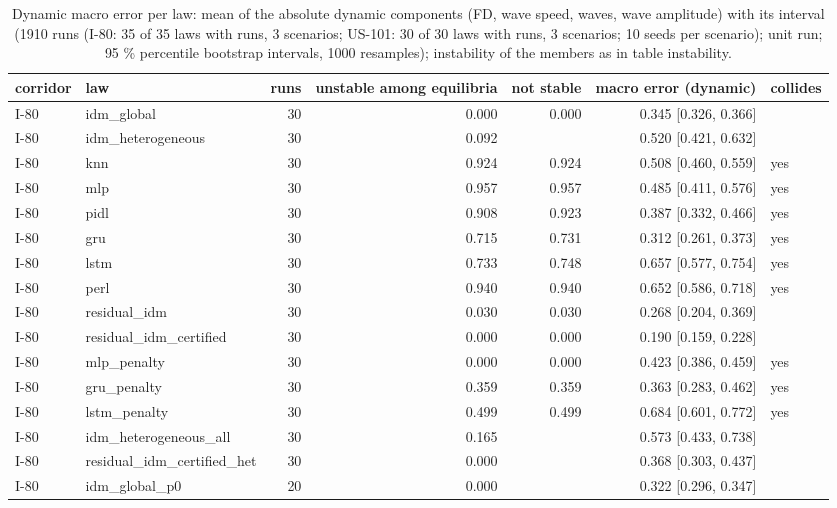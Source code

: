 \begin{table}[htbp]
\centering
\caption{Dynamic macro error per law: mean of the absolute dynamic components (FD, wave speed, waves, wave amplitude) with its interval (1910 runs (I-80: 35 of 35 laws with runs, 3 scenarios; US-101: 30 of 30 laws with runs, 3 scenarios; 10 seeds per scenario); unit run; 95 \% percentile bootstrap intervals, 1000 resamples); instability of the members as in table instability.}
\label{tab:macro-error-dynamic}
\small
\begin{tabular}{llrrrrl}
\toprule
corridor & law & runs & unstable among equilibria & not stable & macro error (dynamic) & collides \\
\midrule
I-80 & idm\_global & 30 & 0.000 & 0.000 & 0.345 [0.326, 0.366] &  \\
I-80 & idm\_heterogeneous & 30 & 0.092 &  & 0.520 [0.421, 0.632] &  \\
I-80 & knn & 30 & 0.924 & 0.924 & 0.508 [0.460, 0.559] & yes \\
I-80 & mlp & 30 & 0.957 & 0.957 & 0.485 [0.411, 0.576] & yes \\
I-80 & pidl & 30 & 0.908 & 0.923 & 0.387 [0.332, 0.466] & yes \\
I-80 & gru & 30 & 0.715 & 0.731 & 0.312 [0.261, 0.373] & yes \\
I-80 & lstm & 30 & 0.733 & 0.748 & 0.657 [0.577, 0.754] & yes \\
I-80 & perl & 30 & 0.940 & 0.940 & 0.652 [0.586, 0.718] & yes \\
I-80 & residual\_idm & 30 & 0.030 & 0.030 & 0.268 [0.204, 0.369] &  \\
I-80 & residual\_idm\_certified & 30 & 0.000 & 0.000 & 0.190 [0.159, 0.228] &  \\
I-80 & mlp\_penalty & 30 & 0.000 & 0.000 & 0.423 [0.386, 0.459] & yes \\
I-80 & gru\_penalty & 30 & 0.359 & 0.359 & 0.363 [0.283, 0.462] & yes \\
I-80 & lstm\_penalty & 30 & 0.499 & 0.499 & 0.684 [0.601, 0.772] & yes \\
I-80 & idm\_heterogeneous\_all & 30 & 0.165 &  & 0.573 [0.433, 0.738] &  \\
I-80 & residual\_idm\_certified\_het & 30 & 0.000 &  & 0.368 [0.303, 0.437] &  \\
I-80 & idm\_global\_p0 & 20 & 0.000 &  & 0.322 [0.296, 0.347] &  \\

\end{tabular}
\end{table}
